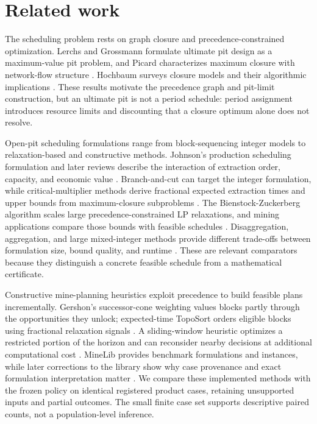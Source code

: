 \documentclass[11pt]{article}
\begin{document}
\section{Related work}
The scheduling problem rests on graph closure and precedence-constrained optimization. Lerchs and Grossmann formulate ultimate pit design as a maximum-value pit problem, and Picard characterizes maximum closure with network-flow structure \cite{lerchs1965,picard1976}. Hochbaum surveys closure models and their algorithmic implications \cite{hochbaum2004}. These results motivate the precedence graph and pit-limit construction, but an ultimate pit is not a period schedule: period assignment introduces resource limits and discounting that a closure optimum alone does not resolve.

Open-pit scheduling formulations range from block-sequencing integer models to relaxation-based and constructive methods. Johnson's production scheduling formulation and later reviews describe the interaction of extraction order, capacity, and economic value \cite{johnson1968,newman2010,lambert2014,meagher2014}. Branch-and-cut can target the integer formulation, while critical-multiplier methods derive fractional expected extraction times and upper bounds from maximum-closure subproblems \cite{caccetta2003,chicoisne}. The Bienstock-Zuckerberg algorithm scales large precedence-constrained LP relaxations, and mining applications compare those bounds with feasible schedules \cite{bienstock,munoz2017}. Disaggregation, aggregation, and large mixed-integer methods provide different trade-offs between formulation size, bound quality, and runtime \cite{boland2009,jelvez2016,askari2010}. These are relevant comparators because they distinguish a concrete feasible schedule from a mathematical certificate.

Constructive mine-planning heuristics exploit precedence to build feasible plans incrementally. Gershon's successor-cone weighting values blocks partly through the opportunities they unlock; expected-time TopoSort orders eligible blocks using fractional relaxation signals \cite{gershon,chicoisne}. A sliding-window heuristic optimizes a restricted portion of the horizon and can reconsider nearby decisions at additional computational cost \cite{cullenbine2011}. MineLib provides benchmark formulations and instances, while later corrections to the library show why case provenance and exact formulation interpretation matter \cite{espinoza2013,jelvez2018}. We compare these implemented methods with the frozen policy on identical registered product cases, retaining unsupported inputs and partial outcomes. The small finite case set supports descriptive paired counts, not a population-level inference.
\end{document}
